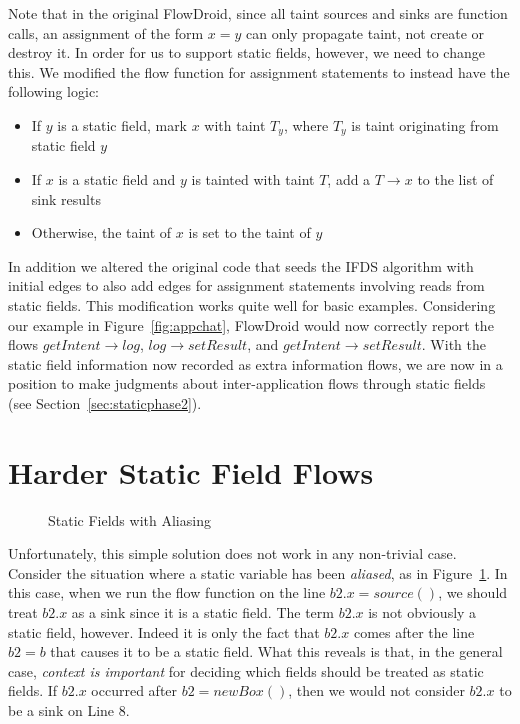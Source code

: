 Note that in the original FlowDroid, since all taint sources and sinks are function calls, an assignment of the form $x = y$ can only propagate taint, not create or destroy it. In order for us to support static fields, however, we need to change this. We modified the flow function for assignment statements to instead have the following logic:

\begin{itemize}
\item If $y$ is a static field, mark $x$ with taint $T_y$, where $T_y$ is taint originating from static field $y$
\item If $x$ is a static field and $y$ is tainted with taint $T$, add a $T\rightarrow x$ to the list of sink results
\item Otherwise, the taint of $x$ is set to the taint of $y$
\end{itemize}

In addition we altered the original code that seeds the IFDS algorithm with initial edges to also add edges for assignment statements involving reads from static fields. This modification works quite well for basic examples. Considering our example in Figure~\ref{fig:appchat}, FlowDroid would now correctly report the flows $getIntent\rightarrow log$, $log\rightarrow setResult$, and $getIntent\rightarrow setResult$. With the static field information now recorded as extra information flows, we are now in a position to make judgments about inter-application flows through static fields (see Section~\ref{sec:staticphase2}).

\section{Harder Static Field Flows}

\begin{figure}
\begin{framed}
\begin{center}
\begin{minipage}{0.85\textwidth}

\end{minipage}
\end{center}
\caption{Static Fields with Aliasing}
\label{fig:aliased}
\end{framed}
\end{figure}

Unfortunately, this simple solution does not work in any non-trivial case. Consider the situation where a static variable has been \emph{aliased}, as in Figure~\ref{fig:aliased}. In this case, when we run the flow function on the line $b2.x = source()$, we should treat $b2.x$ as a sink since it is a static field. The term $b2.x$ is not obviously a static field, however. Indeed it is only the fact that $b2.x$ comes after the line $b2 = b$ that causes it to be a static field. What this reveals is that, in the general case, \emph{context is important} for deciding which fields should be treated as static fields. If $b2.x$ occurred after $b2 = new Box()$, then we would not consider $b2.x$ to be a sink on Line 8.


